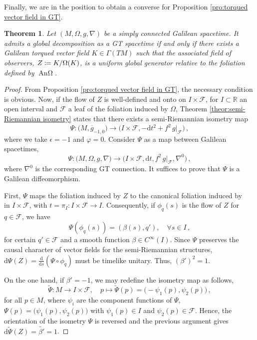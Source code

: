 \documentclass[12pt]{article}
\newcommand{\diff}{\mathrm{d}}
\newcommand{\ds}{\diff s}
\newcommand{\dt}{\diff t}
\newcommand{\To}{\longrightarrow}
\newcommand{\coloneq}{\vcentcolon\mathrel{\mkern -1.2mu}\mathrel{=}}
\newcommand{\spacetime}{(M,\Omega,g,\nabla)}
\DeclareMathOperator{\pt}{\partial_t}
\DeclareMathOperator{\An}{\text{An}\Omega}
\newtheorem{theor}[defi]{Theorem}
\def\R{\mathbb R}
\def\f{\mathcal F}
\begin{document}
Finally, we are in the position to obtain a converse for Proposition \ref{pro:torqued vector field in GT}. 
\begin{theor}\label{theor:splitting global}
    Let $\spacetime$ be a simply connected Galilean spacetime. %
    It admits a global decomposition as a GT spacetime if and only if there exists a Galilean torqued vector field $K\in \Gamma(TM)$ such that the associated field of observers, $Z\coloneq K/\Omega(K)$, is a uniform global generator relative to the foliation defined by $\An$. %
\end{theor}
\begin{proof}
    From Proposition \ref{pro:torqued vector field in GT}, the necessary condition is obvious.
    Now, if the flow of $Z$ is well-defined and onto on $I\times \f$, for $I\subset \R$ an open interval and $\f$ a leaf of the foliation induced by $\Omega$, Theorem \ref{theor:semi-Riemannian isometry} states that there exists a semi-Riemannian isometry map 
    $$
    \Psi\colon \big(M,\overline{g}_{-1,0}\big) \To \big(I\times \f, - \dt^2 + f^2 \, g|_{\f}\big)\,,
    $$
    where we take $\epsilon=-1$ and $\varphi=0$. 
    Consider $\Psi$ as a map between Galilean spacetimes,
    $$
    \Psi\colon \big(M,\Omega,g,\nabla\big) \To \big(I\times \f, \dt, f^2\, g|_{\f},\nabla^0\big)\,,
    $$ 
    where $\nabla^0$ is the corresponding GT connection. It suffices to prove that $\Psi$ is a Galilean diffeomorphism.
    
    First, $\Psi$ maps the foliation induced by $Z$ to the canonical foliation induced by $\pt$ in $I\times \f$, with $t=\pi_I \colon I \times \f \to I$. Consequently, if $\phi_q(s)$ is the flow of $Z$ for $q\in \f$, we have $$\Psi(\phi_q(s)) = (\beta(s),q'),\quad \forall s\in I\,,$$ 
    for certain $q'\in \f$ and a smooth function $\beta\in C^\infty (I)$. Since $\Psi$ preserves the causal character of vector fields for the semi-Riemannian structures, $\diff \Psi(Z)=\frac{\diff}{\ds}(\Psi \circ \phi_q)$ must be timelike unitary. Thus, $(\beta')^2 = 1$. 
    
    On the one hand, if $\beta'=-1$, we may redefine the isometry map as follows,
    $$\widetilde{\Psi}\colon M \to I \times \f, \quad p\longmapsto \widetilde{\Psi}(p) = \big(-\psi_1(p), \psi_2(p)\big)\,,$$
    for all $p\in M$, where $\psi_i$ are the component functions of $\Psi$, $\Psi(p) = \big(\psi_1(p), \psi_2(p)\big)$ with $\psi_1(p)\in I$ and $\psi_2(p)\in \f$. Hence, the orientation of the isometry $\Psi$ is reversed and the previous argument gives $\diff \widetilde{\Psi} (Z) = \widetilde{\beta'}=1$.
    

\end{proof}
\end{document}
